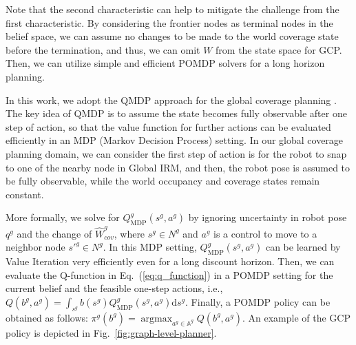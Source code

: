 \documentclass[letterpaper]{article} %
\newcommand{\phdone}[1]{} %
\newcommand{\argmax}{\mathop{\mathrm{argmax}}}
\begin{document}
%
%
\phdone{GCP Problem Approximation}
Note that the second characteristic can help to mitigate the challenge from the first characteristic.
By considering the frontier nodes as terminal nodes in the belief space, we can assume no changes to be made to the world coverage state before the termination, and thus, we can omit $W$ from the state space for GCP.
Then, we can utilize simple and efficient POMDP solvers for a long horizon planning.
%
%


\phdone{POMDP Solver for GCP}
In this work, we adopt the QMDP approach for the global coverage planning \cite{littman1995learning}.
The key idea of QMDP is to assume the state becomes fully observable after one step of action, so that the value function for further actions can be evaluated efficiently in an MDP (Markov Decision Process) setting.
In our global coverage planning domain, we can consider the first step of action is for the robot to snap to one of the nearby node in Global IRM, and then, the robot pose is assumed to be fully observable, while the world occupancy and coverage states remain constant.

%


\phdone{QMDP Details}
More formally, we solve for $Q^g_{\mathrm{MDP}}(s^g, a^g)$ by ignoring uncertainty in robot pose $q^g$ and the change of $\hat{W}^g_{cov}$, where $s^g \in N^g$ and $a^g$ is a control to move to a neighbor node $s'^g \in N^g$.
In this MDP setting, $Q^g_{\mathrm{MDP}}(s^g, a^g)$ can be learned by Value Iteration very efficiently even for a long discount horizon.
%
Then, we can evaluate the Q-function in Eq.~(\ref{eq:q_function}) in a POMDP setting for the current belief and the feasible one-step actions, i.e.,
$Q(b^g, a^g) = \int_{s^g} b(s^g) Q^g_{\mathrm{MDP}}(s^g, a^g) \mathrm{d}s^g$.
%
Finally, a POMDP policy can be obtained as follows:
$\pi^g(b^g) = \argmax_{a^g \in \mathbb{A}^g} Q(b^g, a^g)$.
%
An example of the GCP policy is depicted in Fig.~\ref{fig:graph-level-planner}.
\end{document}
